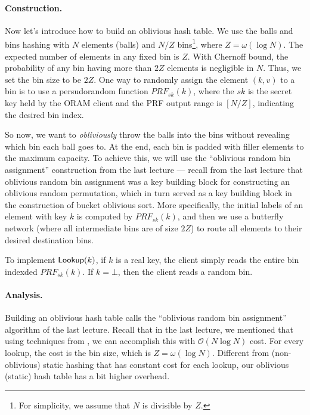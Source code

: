 \paragraph{Construction.}
Now let's introduce how to build an oblivious hash table.
We use the balls and bins hashing with $N$ elements (balls) and $N / Z$ 
bins\footnote{For simplicity, we assume that $N$ is divisible by $Z$.}, where $Z=\omega(\log N)$.
The expected number of elements in any fixed bin is $Z$. 
With Chernoff bound, the probability of any bin having more than $2Z$ elements is negligible in $N$.
Thus, we set the bin size to be $2Z$.
One way to randomly assign the element $(k, v)$ to a bin is to use a persudorandom function $PRF_{sk}(k)$, where the $sk$ is the secret key held by the ORAM client and the PRF output range is $[N/Z]$, indicating the desired bin index.

So now, we want to {\it obliviously} throw the balls into the bins without revealing which bin each ball goes to.
At the end, each bin is padded with filler elements to the maximum capacity.
To achieve this, we will use the 
``oblivious random bin assignment''
construction from the last lecture --- recall
from the last lecture that oblivious random bin assignment
was a key building block for constructing
an oblivious random permutation, which 
in turn served as a key building block in the construction
of bucket oblivious sort.
More specifically, the initial labels of an element with key $k$ 
is computed by $PRF_{sk}(k)$, and then we use a butterfly
network (where all intermediate bins are of size $2Z$)
to route all elements to their desired destination bins.

To implement ${\sf Lookup}(k)$, if $k$ is a real key,
the client simply reads the entire bin indexded $PRF_{sk}(k)$.
If $k = \bot$, then 
the client reads a random bin.

\paragraph{Analysis.} 
Building an oblivious hash table %
calls the ``oblivious random bin assignment'' algorithm
of the last lecture.  
Recall that in the last lecture,
we mentioned 
that using techniques from \cite{domulticore, tianyao-sort}, 
we can accomplish this with 
$\mathcal{O}(N \log N)$ cost. %
For every lookup, the cost is the bin size, which is $Z = \omega(\log N)$.
Different from (non-oblivious) 
static hashing that has constant cost for each lookup, 
our oblivious (static) hash table has a bit higher overhead.

